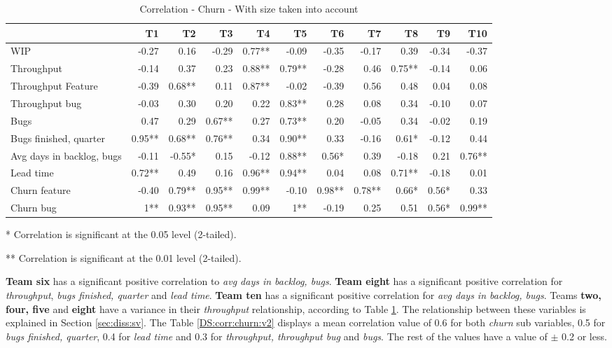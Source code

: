 \documentclass[UKenglish]{ifimaster}  %
\begin{document}
 \begin{table}[H]
\begin{adjustwidth}{-2.5cm}{}
 \centering
 \begin{tabular}{|l|r|r|r|r|r|r|r|r|r|r|}
\hline
 &  \bf{T1} & \bf{T2} & \bf{T3} & \bf{T4} & \bf{T5} & \bf{T6} & \bf{T7} & \bf{T8} & \bf{T9} & \bf{T10}\\ \hline
 WIP  & -0.27 & 0.16 & -0.29 & 0.77** & -0.09 & -0.35 & -0.17 & 0.39 & -0.34 & -0.37 \\ \hline
 Throughput  & -0.14 & 0.37 & 0.23 & 0.88** & 0.79** & -0.28 & 0.46 & 0.75** & -0.14 & 0.06 \\ \hline
 Throughput Feature  & -0.39 & 0.68** & 0.11 & 0.87** & -0.02 & -0.39 & 0.56 & 0.48 & 0.04 & 0.08 \\ \hline
 Throughput bug  & -0.03 & 0.30 & 0.20 & 0.22 & 0.83** & 0.28 & 0.08 & 0.34 & -0.10 & 0.07 \\ \hline
 Bugs  & 0.47 & 0.29 & 0.67** & 0.27 & 0.73** & 0.20 & -0.05 & 0.34 & -0.02 & 0.19 \\ \hline
 Bugs finished, quarter  & 0.95** & 0.68** & 0.76** & 0.34 & 0.90** & 0.33 & -0.16 & 0.61* & -0.12 & 0.44 \\ \hline
 Avg days in backlog, bugs  & -0.11 & -0.55* & 0.15 & -0.12 & 0.88** & 0.56* & 0.39 & -0.18 & 0.21 & 0.76** \\ \hline
 Lead time  & 0.72** & 0.49 & 0.16 & 0.96** & 0.94** & 0.04 & 0.08 & 0.71** & -0.18 & 0.01 \\ \hline
 Churn feature  & -0.40 & 0.79** & 0.95** & 0.99** & -0.10 & 0.98** & 0.78** & 0.66* & 0.56* & 0.33 \\ \hline
 Churn bug  & 1** & 0.93** & 0.95** & 0.09 & 1** & -0.19 & 0.25 & 0.51 & 0.56* & 0.99** \\ \hline
\end{tabular}
 \caption{Correlation - Churn - With size taken into account}
 \label{corr:churn:v2}
 \centerline {* Correlation is significant at the 0.05 level (2-tailed).}
\centerline{** Correlation is significant at the 0.01 level (2-tailed).}
\end{adjustwidth}
\end{table}
\textbf{Team six} has a significant positive correlation to \textit{avg days in backlog, bugs}. \textbf{Team eight} has a significant positive correlation for \textit{throughput}, \textit{bugs finished, quarter} and \textit{lead time}. \textbf{Team ten} has a significant positive correlation for \textit{avg days in backlog, bugs}.  Teams \textbf{two, four, five} and \textbf{eight} have a variance in their \textit{throughput} relationship, according to Table \ref{corr:churn:v2}. The relationship between these variables is explained in Section \ref{sec:diss:sv}. The Table \ref{DS:corr:churn:v2} displays a mean correlation value of 0.6 for both \textit{churn} sub variables, 0.5 for \textit{bugs finished, quarter}, 0.4 for \textit{lead time} and 0.3 for \textit{throughput, throughput bug} and \textit{bugs}. The rest of the values have a value of $\pm$ 0.2 or less.
\end{document}
